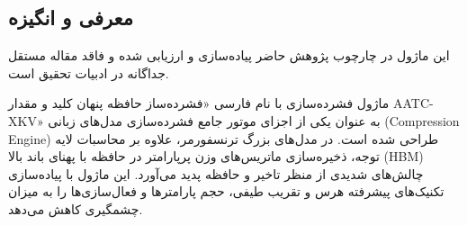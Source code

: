 \subsection{معرفی و انگیزه}
این ماژول در چارچوب پژوهش حاضر پیاده‌سازی و ارزیابی شده و فاقد مقاله مستقل جداگانه در ادبیات تحقیق است.

ماژول فشرده‌سازی  با نام فارسی «فشرده‌ساز حافظه پنهان کلید و مقدار AATC-XKV» به عنوان یکی از اجزای موتور جامع فشرده‌سازی مدل‌های زبانی (Compression Engine) طراحی شده است. در مدل‌های بزرگ ترنسفورمر، علاوه بر محاسبات لایه توجه، ذخیره‌سازی ماتریس‌های وزن پرپارامتر در حافظه با پهنای باند بالا (HBM) چالش‌های شدیدی از منظر تاخیر و حافظه پدید می‌آورد. این ماژول با پیاده‌سازی تکنیک‌های پیشرفته هرس و تقریب طیفی، حجم پارامترها و فعال‌سازی‌ها را به میزان چشمگیری کاهش می‌دهد.
